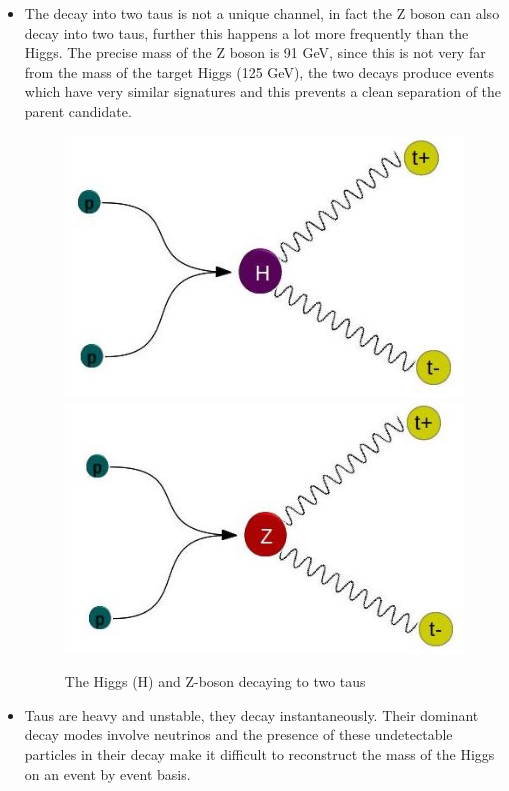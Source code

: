 \documentclass[final,3p,times,twocolumn]{elsarticle}
\begin{document}
\begin{itemize}

\item{The decay into two taus is not a unique channel, in fact the Z boson can also decay into two taus, further this happens a lot more frequently than the Higgs. The precise mass of the Z boson is 91 GeV, since this is not very far from the mass of the target Higgs (125 GeV), the two decays produce events which have very similar signatures and this prevents a clean separation of the parent candidate.}

\begin{figure}
\includegraphics[scale=0.5]{Images/H1.jpg}
\includegraphics[scale=0.5]{Images/Zb.jpg}
\caption{The Higgs (H) and Z-boson decaying to two taus}
\label{H_decay}
\end{figure}

\item{Taus are heavy and unstable, they decay instantaneously. Their dominant decay modes involve neutrinos and the presence of these undetectable particles in their decay make it difficult to reconstruct the mass of the Higgs on an event by event basis.}
\end{itemize}
\end{document}
